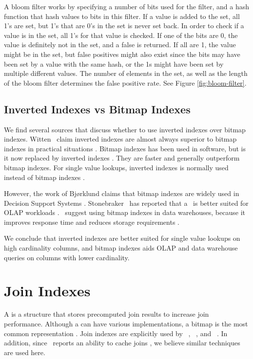 A bloom filter works by specifying a number of bits used for the filter, and a hash function that hash values to bits in this filter. If a value is added to the set, all 1's are set, but 1's that are 0's in the set is never set back. In order to check if a value is in the set, all 1's for that value is checked. If one of the bits are 0, the value is definitely not in the set, and a false is returned. If all are 1, the value might be in the set, but false positives might also exist since the bits may have been set by a value with the same hash, or the 1s might have been set by multiple different values. The number of elements in the set, as well as the length of the bloom filter determines the false positive rate. See Figure \ref{fig:bloom-filter}.

\subsection{Inverted Indexes vs Bitmap Indexes}
\label{sub:Inverted Indexes vs Bitmap Indexes}
We find several sources that discuss whether to use inverted indexes over bitmap indexes. Witten \ea~claim inverted indexes are almost always superior to bitmap indexes in practical situations \cite{Witten1999-qq}. Bitmap indexes has been used in  software, but is it now replaced by inverted indexes \cite{Bjorklund2011-wh}. They are faster and generally outperform bitmap indexes. For single value lookups, inverted indexes is normally used instead of bitmap indexes \cite{Moffat1992-tz}.

However, the work of Bjørklund claims that bitmap indexes are widely used in Decision Support Systems \cite{Bjorklund2011-wh}. Stonebraker \ea~has reported that a \biti~is better suited for OLAP workloads \cite{Stonebraker2005-qz}. \oracle~suggest using bitmap indexes in data warehouses, because it improves response time and reduces storage requirements \cite{noauthor_undated-hp}.

We conclude that inverted indexes are better suited for single value lookups on high cardinality columns, and bitmap indexes aids OLAP and data warehouse queries on columns with lower cardinality.

\section{Join Indexes}
\label{sec:Join Indexes}
A  is a structure that stores precomputed join results to increase join performance. Although a  can have various implementations, a bitmap is the most common representation \cite{Bjorklund2011-wh}. Join indexes are explicitly used by \monetdb~\cite{Boncz2002-yj}, \monetx~\cite{Boncz2005-wj}, and \oracle~\cite{noauthor_undated-hp}. In addition, since \exasol~reports an ability to cache joins \cite{Exasol2014-xh}, we believe similar techniques are used here.

